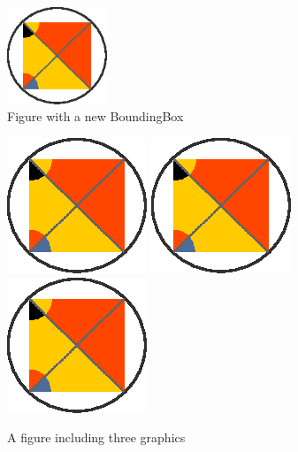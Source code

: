 \documentclass{aa}
\begin{document}
   \begin{figure}
   \centering
   \includegraphics[bb=5 20 60 60,width=3cm,clip]{figure.eps}
      \caption{Figure with a new BoundingBox}
         \label{fig4}
   \end{figure}



   \begin{figure}[h!]
   \centering
    \includegraphics{figure.eps}
    \includegraphics[angle=90]{figure.eps}
    \includegraphics{figure.eps}
      \caption{A figure including three graphics}
         \label{fig5}
   \end{figure}
\end{document}
